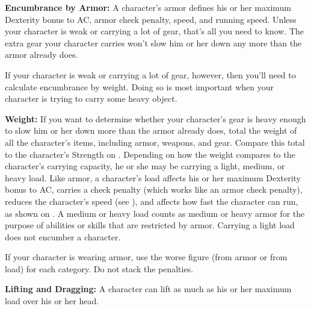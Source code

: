 \textbf{Encumbrance by Armor:} A character's armor defines his or her maximum Dexterity bonus to AC, armor check penalty, speed, and running speed. Unless your character is weak or carrying a lot of gear, that's all you need to know. The extra gear your character carries won't slow him or her down any more than the armor already does.

If your character is weak or carrying a lot of gear, however, then you'll need to calculate encumbrance by weight. Doing so is most important when your character is trying to carry some heavy object.

\textbf{Weight:} If you want to determine whether your character's gear is heavy enough to slow him or her down more than the armor already does, total the weight of all the character's items, including armor, weapons, and gear. Compare this total to the character's Strength on . Depending on how the weight compares to the character's carrying capacity, he or she may be carrying a light, medium, or heavy load. Like armor, a character's load affects his or her maximum Dexterity bonus to AC, carries a check penalty (which works like an armor check penalty), reduces the character's speed (see ), and affects how fast the character can run, as shown on . A medium or heavy load counts as medium or heavy armor for the purpose of abilities or skills that are restricted by armor. Carrying a light load does not encumber a character.

If your character is wearing armor, use the worse figure (from armor or from load) for each category. Do not stack the penalties.



\textbf{Lifting and Dragging:} A character can lift as much as his or her maximum load over his or her head.

